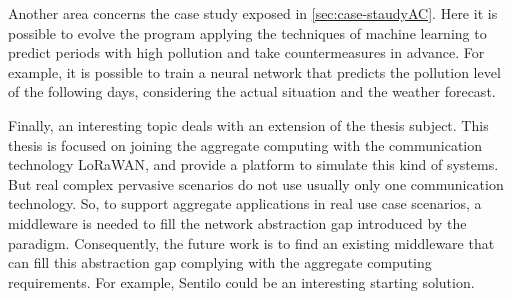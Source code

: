 Another area concerns the case study exposed in \cref{sec:case-staudyAC}. 
Here it is possible to evolve the program applying the techniques of machine learning to predict periods with high pollution and take countermeasures in advance. 
For example, it is possible to train a neural network that predicts the pollution level of the following days, considering the actual situation and the weather forecast.

Finally, an interesting topic deals with an extension of the thesis subject.
This thesis is focused on joining the aggregate computing with the communication technology LoRaWAN, and provide a platform to simulate this kind of systems.
But real complex pervasive scenarios do not use usually only one communication technology.
So, to support aggregate applications in real use case scenarios, a middleware is needed to fill the network abstraction gap introduced by the paradigm.
Consequently, the future work is to find an existing middleware that can fill this abstraction gap complying with the aggregate computing requirements. For example, Sentilo could be an interesting starting solution.